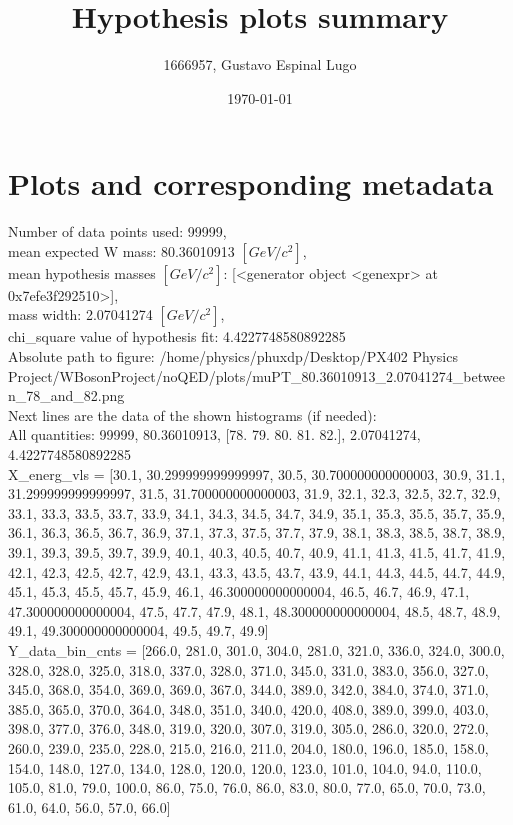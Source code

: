 \documentclass[12pt]{article}
\begin{document}
	\title{Hypothesis plots summary} %
	\author{1666957, Gustavo Espinal Lugo}
	\date{\today} %

	\maketitle
	
	\section*{Plots and corresponding metadata}
	Number of data points used: 99999,\\
mean expected W mass: 80.36010913 $[GeV/c^{2}]$,\\
mean hypothesis masses $[GeV/c^{2}]$: [<generator object <genexpr> at 0x7efe3f292510>],\\
mass width: 2.07041274 $[GeV/c^{2}]$,\\
chi\_square value of hypothesis fit: 4.4227748580892285\\
	Absolute path to figure: /home/physics/phuxdp/Desktop/PX402 Physics Project/WBosonProject/noQED/plots/muPT\_80.36010913\_2.07041274\_between\_78\_and\_82.png\\
	Next lines are the data of the shown histograms (if needed): \\
	All quantities: 	99999, 80.36010913, [78. 79. 80. 81. 82.], 2.07041274, 4.4227748580892285\\
	X\_energ\_vls = [30.1, 30.299999999999997, 30.5, 30.700000000000003, 30.9, 31.1, 31.299999999999997, 31.5, 31.700000000000003, 31.9, 32.1, 32.3, 32.5, 32.7, 32.9, 33.1, 33.3, 33.5, 33.7, 33.9, 34.1, 34.3, 34.5, 34.7, 34.9, 35.1, 35.3, 35.5, 35.7, 35.9, 36.1, 36.3, 36.5, 36.7, 36.9, 37.1, 37.3, 37.5, 37.7, 37.9, 38.1, 38.3, 38.5, 38.7, 38.9, 39.1, 39.3, 39.5, 39.7, 39.9, 40.1, 40.3, 40.5, 40.7, 40.9, 41.1, 41.3, 41.5, 41.7, 41.9, 42.1, 42.3, 42.5, 42.7, 42.9, 43.1, 43.3, 43.5, 43.7, 43.9, 44.1, 44.3, 44.5, 44.7, 44.9, 45.1, 45.3, 45.5, 45.7, 45.9, 46.1, 46.300000000000004, 46.5, 46.7, 46.9, 47.1, 47.300000000000004, 47.5, 47.7, 47.9, 48.1, 48.300000000000004, 48.5, 48.7, 48.9, 49.1, 49.300000000000004, 49.5, 49.7, 49.9]\\
	Y\_data\_bin\_cnts = [266.0, 281.0, 301.0, 304.0, 281.0, 321.0, 336.0, 324.0, 300.0, 328.0, 328.0, 325.0, 318.0, 337.0, 328.0, 371.0, 345.0, 331.0, 383.0, 356.0, 327.0, 345.0, 368.0, 354.0, 369.0, 369.0, 367.0, 344.0, 389.0, 342.0, 384.0, 374.0, 371.0, 385.0, 365.0, 370.0, 364.0, 348.0, 351.0, 340.0, 420.0, 408.0, 389.0, 399.0, 403.0, 398.0, 377.0, 376.0, 348.0, 319.0, 320.0, 307.0, 319.0, 305.0, 286.0, 320.0, 272.0, 260.0, 239.0, 235.0, 228.0, 215.0, 216.0, 211.0, 204.0, 180.0, 196.0, 185.0, 158.0, 154.0, 148.0, 127.0, 134.0, 128.0, 120.0, 120.0, 123.0, 101.0, 104.0, 94.0, 110.0, 105.0, 81.0, 79.0, 100.0, 86.0, 75.0, 76.0, 86.0, 83.0, 80.0, 77.0, 65.0, 70.0, 73.0, 61.0, 64.0, 56.0, 57.0, 66.0]\\
\end{document}
